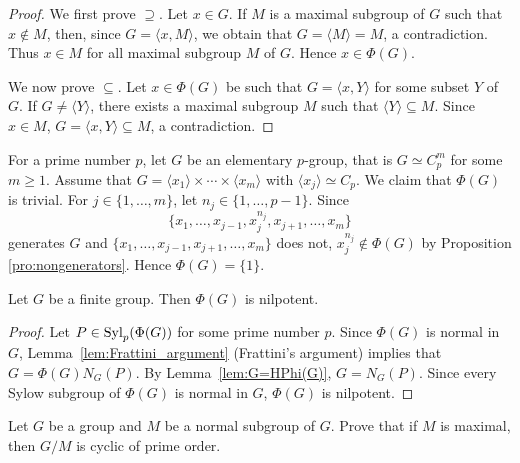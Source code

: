 \begin{proof}
We first prove $\supseteq$. Let $x\in G$. If $M$ is a maximal subgroup of $G$ such that $x\not\in M$, then, since $G=\langle
	x,M\rangle$, we obtain that $G=\langle M\rangle=M$, a contradiction. Thus $x\in M$ for all maximal subgroup $M$ of $G$. Hence 
 $x\in \Phi(G)$. 

We now prove $\subseteq$. Let $x\in\Phi(G)$ be such that $G=\langle
	x,Y\rangle$ for some subset $Y$ of $G$. If $G\ne \langle Y\rangle$,
	there exists a maximal subgroup $M$ such that $\langle Y\rangle\subseteq M$. Since
	$x\in M$, $G=\langle x,Y\rangle\subseteq M$, a contradiction. 
\end{proof}

\begin{example}
For a prime number $p$, let $G$ be an elementary $p$-group, that is 
$G\simeq C_p^m$ for some $m\geq1$. Assume that 
	$G=\langle x_1\rangle\times\cdots\times\langle x_m\rangle$ with $\langle x_j\rangle\simeq C_p$.  
	We claim that $\Phi(G)$ is trivial. 
	For $j\in\{1,\dots,m\}$, let $n_j\in\{1,\dots,p-1\}$. Since 
	\[
	\{x_1,\dots,x_{j-1},x_j^{n_j},x_{j+1},\dots,x_m\}
	\]
	generates $G$ and $\{x_1,\dots,x_{j-1},x_{j+1},\dots,x_m\}$ does not, 
	$x_j^{n_j}\not\in\Phi(G)$ by Proposition \ref{pro:nongenerators}. 
	Hence $\Phi(G)=\{1\}$.
\end{example}

\begin{theorem}[Frattini]
\label{thm:Frattini}
Let $G$ be a finite group. Then $\Phi(G)$ is nilpotent.
\end{theorem}

\begin{proof}
Let $P\in\mathrm{Syl}_p(\Phi(G))$ for some prime number $p$. Since $\Phi(G)$ is normal in 
$G$, Lemma~\ref{lem:Frattini_argument} (Frattini's argument) implies that 
$G=\Phi(G)N_G(P)$. By Lemma~\ref{lem:G=HPhi(G)},
$G=N_G(P)$. Since every Sylow subgroup of $\Phi(G)$ is normal in $G$,
$\Phi(G)$ is nilpotent. 
\end{proof}

\begin{exercise}
\label{xca:G/M}
Let $G$ be a group and $M$ be a normal subgroup of $G$. Prove that if  
$M$ is maximal, then 
$G/M$ is cyclic of prime order. 
\end{exercise}


